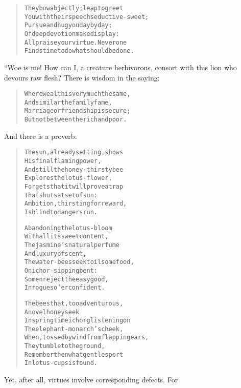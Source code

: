 \documentclass[article, twoside, 10pt]{memoir}
\renewenvironment{verbatim}{%
\begin{quote}%
\vskip -10pt%
\begin{alltt}\normalfont\small}{\end{alltt}%
\end{quote}%
\vskip -10pt
} %
\begin{document}
\begin{verbatim}
They bow abjectly; leap to greet
You with their speech seductive-sweet;
Pursue and hug you day by day;
Of deep devotion make display:
All praise your virtue. Never one
Finds time to do what should be done.
\end{verbatim}
“Woe is me! How can I, a creature herbivorous, consort with this
lion who devours raw flesh? There is wisdom in the saying:

\begin{verbatim}
Where wealth is very much the same,
And similar the family fame,
Marriage or friendship is secure;
But not between the rich and poor.
\end{verbatim}
And there is a proverb:

\begin{verbatim}
The sun, already setting, shows
    His final flaming power,
And still the honey-thirsty bee
    Explores the lotus-flower,
Forgets that it will prove a trap
    That shuts at set of sun:
Ambition, thirsting for reward,
    Is blind to dangers run.

Abandoning the lotus-bloom
    With all its sweet content,
The jasmine's natural perfume
    And luxury of scent,
The water-bees seek toilsome food,
    On ichor-sipping bent:
So men reject the easy good,
    In rogues o'erconfident.

The bees that, too adventurous,
    A novel honey seek
In springtime ichor glistening on
    The elephant-monarch's cheek,
When, tossed by wind from flapping ears,
    They tumble to the ground,
Remember then what gentle sport
    In lotus-cups is found.
\end{verbatim}
Yet, after all, virtues involve corresponding defects. For
\end{document}
